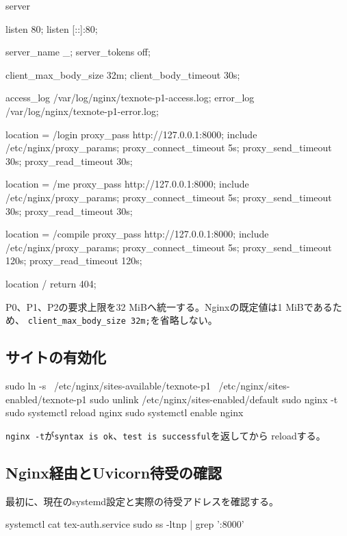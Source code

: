 \documentclass[uplatex,a4paper,11pt]{jsarticle}
\begin{document}
\begin{command}
server {
    listen 80;
    listen [::]:80;

    server_name _;
    server_tokens off;

    client_max_body_size 32m;
    client_body_timeout 30s;

    access_log /var/log/nginx/texnote-p1-access.log;
    error_log  /var/log/nginx/texnote-p1-error.log;

    location = /login {
        proxy_pass http://127.0.0.1:8000;
        include /etc/nginx/proxy_params;
        proxy_connect_timeout 5s;
        proxy_send_timeout 30s;
        proxy_read_timeout 30s;
    }

    location = /me {
        proxy_pass http://127.0.0.1:8000;
        include /etc/nginx/proxy_params;
        proxy_connect_timeout 5s;
        proxy_send_timeout 30s;
        proxy_read_timeout 30s;
    }

    location = /compile {
        proxy_pass http://127.0.0.1:8000;
        include /etc/nginx/proxy_params;
        proxy_connect_timeout 5s;
        proxy_send_timeout 120s;
        proxy_read_timeout 120s;
    }

    location / {
        return 404;
    }
}
\end{command}

P0、P1、P2の要求上限を32 MiBへ統一する。Nginxの既定値は1 MiBであるため、
\texttt{client\_max\_body\_size 32m;}を省略しない。

\subsection{サイトの有効化}

\begin{command}
sudo ln -s \
  /etc/nginx/sites-available/texnote-p1 \
  /etc/nginx/sites-enabled/texnote-p1
sudo unlink /etc/nginx/sites-enabled/default
sudo nginx -t
sudo systemctl reload nginx
sudo systemctl enable nginx
\end{command}

\texttt{nginx -t}が\texttt{syntax is ok}、\texttt{test is successful}を返してから
reloadする。

\subsection{Nginx経由とUvicorn待受の確認}

最初に、現在のsystemd設定と実際の待受アドレスを確認する。

\begin{command}
systemctl cat tex-auth.service
sudo ss -ltnp | grep ':8000'
\end{command}
\end{document}
